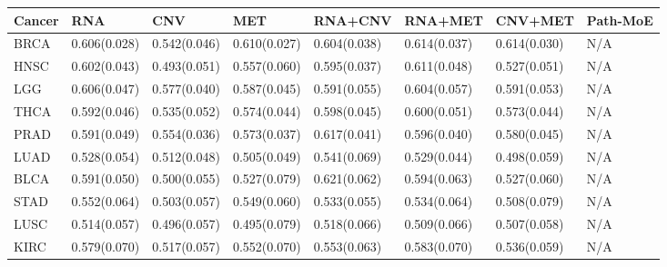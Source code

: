\begin{tabular}{llllllll}
\toprule
Cancer & RNA & CNV & MET & RNA+CNV & RNA+MET & CNV+MET & Path-MoE \\
\midrule
BRCA & 0.606(0.028) & 0.542(0.046) & 0.610(0.027) & 0.604(0.038) & 0.614(0.037) & 0.614(0.030) & N/A \\
HNSC & 0.602(0.043) & 0.493(0.051) & 0.557(0.060) & 0.595(0.037) & 0.611(0.048) & 0.527(0.051) & N/A \\
LGG & 0.606(0.047) & 0.577(0.040) & 0.587(0.045) & 0.591(0.055) & 0.604(0.057) & 0.591(0.053) & N/A \\
THCA & 0.592(0.046) & 0.535(0.052) & 0.574(0.044) & 0.598(0.045) & 0.600(0.051) & 0.573(0.044) & N/A \\
PRAD & 0.591(0.049) & 0.554(0.036) & 0.573(0.037) & 0.617(0.041) & 0.596(0.040) & 0.580(0.045) & N/A \\
LUAD & 0.528(0.054) & 0.512(0.048) & 0.505(0.049) & 0.541(0.069) & 0.529(0.044) & 0.498(0.059) & N/A \\
BLCA & 0.591(0.050) & 0.500(0.055) & 0.527(0.079) & 0.621(0.062) & 0.594(0.063) & 0.527(0.060) & N/A \\
STAD & 0.552(0.064) & 0.503(0.057) & 0.549(0.060) & 0.533(0.055) & 0.534(0.064) & 0.508(0.079) & N/A \\
LUSC & 0.514(0.057) & 0.496(0.057) & 0.495(0.079) & 0.518(0.066) & 0.509(0.066) & 0.507(0.058) & N/A \\
KIRC & 0.579(0.070) & 0.517(0.057) & 0.552(0.070) & 0.553(0.063) & 0.583(0.070) & 0.536(0.059) & N/A \\
\bottomrule
\end{tabular}
